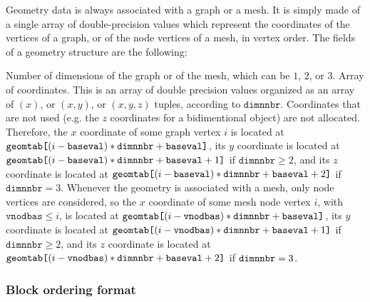 Geometry data is always associated with a graph or a mesh. It is
simply made of a single array of double-precision values which
represent the coordinates of the vertices of a graph, or of
the node vertices of a mesh, in vertex order. The fields of
a geometry structure are the following:
\begin{itemize}
\iteme[{\tt dimnnbr}]
Number of dimensions of the graph or of the mesh, which can be $1$,
$2$, or $3$.
\iteme[{\tt geomtab}]
Array of coordinates. This is an array of double precision values
organized as an array of $(x)$, or $(x,y)$, or $(x,y,z)$ tuples,
according to $\mathtt{dimnnbr}$. Coordinates that are not used
(e.g. the $z$ coordinates for a bidimentional object) are not
allocated. Therefore, the $x$ coordinate of some graph vertex $i$ is
located at $\mathtt{geomtab}\mbox{\tt [}(i - \mathtt{baseval}) *
\mathtt{dimnnbr}  + \mathtt{baseval}\mbox{\tt ]}$, its $y$ coordinate
is located at $\mathtt{geomtab}\mbox{\tt [}(i - \mathtt{baseval}) *
  \mathtt{dimnnbr} + \mathtt{baseval} + 1\mbox{\tt ]}$ if
$\mathtt{dimnnbr} \geq 2$, and its $z$ coordinate is located at
$\mathtt{geomtab}\mbox{\tt [}(i - \mathtt{baseval}) * \mathtt{dimnnbr}
+ \mathtt{baseval} + 2\mbox{\tt ]}$ if $\mathtt{dimnnbr} =
3$. Whenever the geometry is associated with a mesh, 
only node vertices are considered, so the $x$ coordinate of some mesh
node vertex $i$, with $\mathtt{vnodbas} \leq i$, is located
at $\mathtt{geomtab}\mbox{\tt [}(i - \mathtt{vnodbas}) *
\mathtt{dimnnbr} + \mathtt{baseval}\mbox{\tt ]}$, its $y$ coordinate
is located at $\mathtt{geomtab}\mbox{\tt [}(i - \mathtt{vnodbas}) *
\mathtt{dimnnbr} + \mathtt{baseval} + 1\mbox{\tt ]}$ if
$\mathtt{dimnnbr} \geq 2$, and its $z$ coordinate is located at
$\mathtt{geomtab}\mbox{\tt [}(i - \mathtt{vnodbas}) * \mathtt{dimnnbr}
+ \mathtt{baseval} + 2\mbox{\tt ]}$ if $\mbox{\tt dimnnbr} = 3$.
\end{itemize}

\subsubsection{Block ordering format}
\label{sec-lib-format-order}

